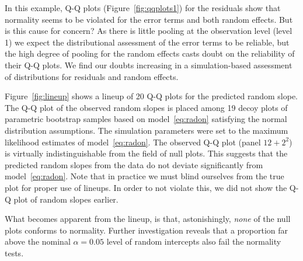 \documentclass[12pt]{article} %
\newcommand{\al}[1]{{\color{red} #1}}
\begin{document}
In this example, Q-Q plots (Figure~\ref{fig:qqplots1}) for the residuals show that normality 
seems to be violated for the error terms and both random effects. But is this cause for concern?
\al{As} there is little pooling at the observation level \al{(level 1)} we expect the distributional assessment of the error terms to be reliable, but  the high degree of pooling  for the random effects  casts doubt on the reliability of their Q-Q plots. 
 We find our doubts increasing in a simulation-based assessment of distributions for residuals and random effects.

Figure~\ref{fig:lineup} shows a lineup \citep{buja:2009} of 20 Q-Q plots for the predicted random slope. The Q-Q plot of the observed random slopes is placed among 19 decoy plots of parametric bootstrap samples based on model~\eqref{eq:radon} satisfying the normal distribution assumptions. The simulation parameters were set to the maximum likelihood estimates of model~\eqref{eq:radon}.
The observed Q-Q plot (panel $12+2^2$) is virtually indistinguishable from the field of null plots. This suggests that the predicted random slopes  from the data do not deviate significantly from model~\eqref{eq:radon}. 
Note that in practice we must blind ourselves from the true plot for proper use of lineups. In order to not violate this, we did not show the Q-Q plot of random slopes earlier.
%
%

What becomes apparent from the lineup, is that, astonishingly, {\it none} of the null plots conforms to normality. Further investigation  reveals  that a  proportion far above the nominal $\alpha=0.05$ level of random intercepts also fail the normality tests.
\end{document}
